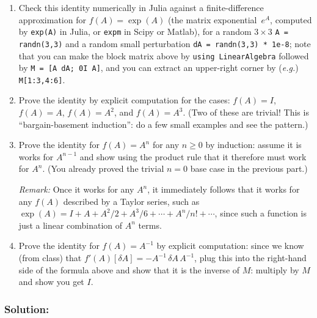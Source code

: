 \documentclass[10pt,oneside]{article}
\begin{document}
\begin{enumerate}

\item Check this identity numerically in Julia against a finite-difference approximation for $f(A) = \exp(A)$ (the matrix exponential~$e^A$, computed by \texttt{exp(A)} in Julia, or \texttt{expm} in Scipy or Matlab), for a random $3 \times 3$ \texttt{A = randn(3,3)} and a random small perturbation \texttt{dA = randn(3,3) * 1e-8}; note that you can make the block matrix above by \texttt{using LinearAlgebra} followed by \texttt{M = [A dA; 0I A]}, and you can extract an upper-right corner by (\textit{e.g.}) \texttt{M[1:3,4:6]}.

\item Prove the identity by explicit computation for the cases: $f(A) = I$, $f(A) = A$, $f(A) = A^2$, and $f(A) = A^3$.  (Two of these are trivial!  This is ``bargain-basement induction'': do a few small examples and see the pattern.)

\item Prove the identity for $f(A) = A^n$ for any $n \ge 0$ by induction: assume it is works for $A^{n-1}$ and show using the product rule that it therefore must work for $A^n$.  (You already proved the trivial $n=0$ base case in the previous part.)

\emph{Remark:} 
Once it works for any $A^n$, it immediately follows that it works for any $f(A)$ described by a Taylor series, such as $\exp(A) = I + A + A^2/2 + A^3/6 + \cdots + A^n / n! + \cdots$, since such a function is just a linear combination of $A^n$ terms.

\item Prove the identity for $f(A) = A^{-1}$ by explicit computation: since we know (from class) that $f'(A)[\delta A] = -A^{-1} \, \delta A \, A^{-1}$, plug this into the right-hand side of the formula above and show that it is the inverse of $M$: multiply by $M$ and show you get $I$.

\end{enumerate}

\subsubsection*{Solution:}
\end{document}
